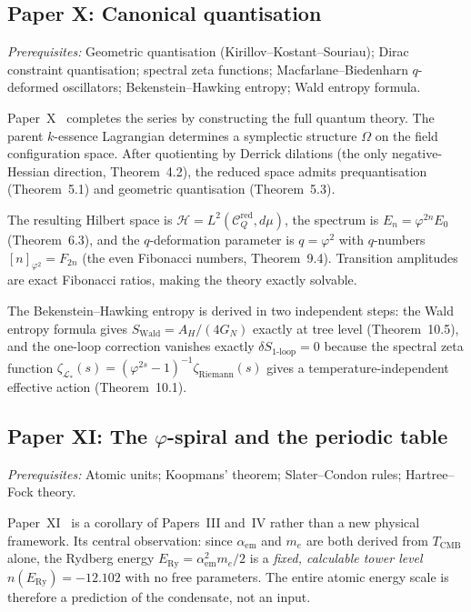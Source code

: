 \documentclass[11pt,a4paper]{article}
\newcommand{\vp}{\varphi}
\newcommand{\aem}{\alpha_{\mathrm{em}}}
\newcommand{\TCMB}{T_{\mathrm{CMB}}}
\begin{document}
\subsection{Paper X: Canonical quantisation}

\textit{Prerequisites:} Geometric quantisation (Kirillov--Kostant--Souriau);
Dirac constraint quantisation; spectral zeta functions; Macfarlane--Biedenharn
$q$-deformed oscillators; Bekenstein--Hawking entropy; Wald entropy formula.

Paper~X~\cite{Paper10} completes the series by constructing the full quantum theory. The
parent $k$-essence Lagrangian determines a symplectic structure $\Omega$ on the
field configuration space. After quotienting by Derrick dilations (the only
negative-Hessian direction, Theorem~4.2), the reduced space
admits prequantisation (Theorem~5.1) and geometric quantisation
(Theorem~5.3).

The resulting Hilbert space is $\mathcal{H} = L^2(\mathcal{C}_Q^{\mathrm{red}}, d\mu)$,
the spectrum is $E_n = \vp^{2n}E_0$ (Theorem~6.3), and the
$q$-deformation parameter is $q=\vp^2$ with $q$-numbers $[n]_{\vp^2} = F_{2n}$
(the even Fibonacci numbers, Theorem~9.4). Transition amplitudes
are exact Fibonacci ratios, making the theory exactly solvable.

The Bekenstein--Hawking entropy is derived in two independent steps: the Wald
entropy formula gives $S_{\mathrm{Wald}} = A_H/(4G_N)$ exactly at tree level
(Theorem~10.5), and the one-loop correction vanishes exactly
$\delta S_{1\text{-loop}} = 0$ because the spectral zeta function
$\zeta_{\mathcal{L}_*}(s) = (\vp^{2s}-1)^{-1}\zeta_{\mathrm{Riemann}}(s)$ gives
a temperature-independent effective action (Theorem~10.1).

\subsection{Paper XI: The $\varphi$-spiral and the periodic table}

\textit{Prerequisites:} Atomic units; Koopmans' theorem; Slater--Condon
rules; Hartree--Fock theory.

Paper~XI~\cite{Paper11} is a corollary of Papers~III and~IV rather than a new physical
framework. Its central observation: since $\aem$ and $m_e$ are both derived
from $\TCMB$ alone, the Rydberg energy $E_{\mathrm{Ry}} = \aem^2 m_e/2$
is a \emph{fixed, calculable tower level} $n(E_{\mathrm{Ry}}) = -12.102$
with no free parameters. The entire atomic energy scale is therefore a
prediction of the condensate, not an input.
\end{document}
